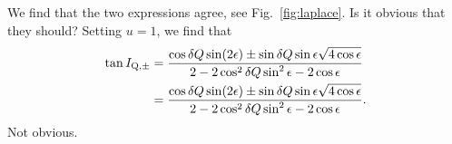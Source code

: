 \documentclass[11pt,
        usenames, %
        dvipsnames %
    ]{article}
\begin{document}
We find that the two expressions agree, see Fig.~\ref{fig:laplace}. Is it
obvious that they should? Setting $u = 1$, we find that
\begin{align}
    \tan I_{\rm Q, \pm} &=
        \frac{\cos \delta Q \sin (2\epsilon) \pm \sin \delta Q
            \sin \epsilon\sqrt{4\cos \epsilon}}{
            2 - 2\cos^2 \delta Q \sin^2\epsilon - 2\cos \epsilon}\nonumber\\
        &=
        \frac{\cos \delta Q \sin (2\epsilon) \pm \sin \delta Q
            \sin \epsilon\sqrt{4\cos \epsilon}}{
            2 - 2\cos^2 \delta Q \sin^2\epsilon - 2\cos \epsilon}.
\end{align}
Not obvious.
\end{document}
